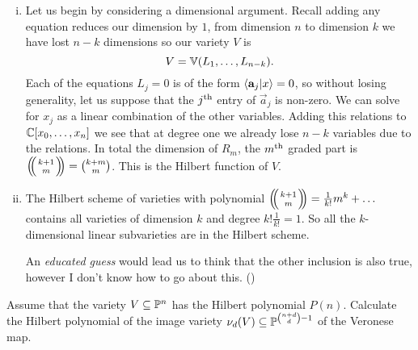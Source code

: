 \documentclass[12pt]{memoir}
\begin{document}
\begin{ptcbr}
	\begin{enumerate}[i)]
		\itemsep=-0.4em
		\item Let us begin by considering a dimensional argument. Recall adding any equation reduces our dimension by $1$, from dimension $n$ to dimension $k$ we have lost $n-k$ dimensions so our variety $V$ is 
		$$V=\mathbb{V}(L_1,\dots,L_{n-k}).$$
		Each of the equations $L_j=0$ is of the form $\braket{\mathbf{a}_j}{x}=0$, so without losing generality, let us suppose that the $j\textsuperscript{th}$ entry of $\vec{a}_j$ is non-zero. We can solve for $x_j$ as a linear combination of the other variables. Adding this relations to $\mathbb{C}[x_0,\dots,x_n]$ we see that at degree one we already lose $n-k$ variables due to the relations. In total the dimension of $R_m$, the $m\textsuperscript{th}$ graded part is $\multinom{k+1}{m}=\binom{k+m}{m}$. This is the Hilbert function of $V$.
		\item The Hilbert scheme of varieties with polynomial $\multinom{k+1}{m}=\frac{1}{k!}m^k+\dots$ contains all varieties of dimension $k$ and degree $k!\frac{1}{k!}=1$. So all the $k$-dimensional linear subvarieties are in the Hilbert scheme.\par 
		An \emph{educated guess} would lead us to think that the other inclusion is also true, however I don't know how to go about this. ()
	\end{enumerate}
\end{ptcbr}

\begin{Ej}
	Assume that the variety $V\subseteq\mathbb{P}^n$ has the Hilbert polynomial
	$P(n)$. Calculate the Hilbert polynomial of the image variety $\nu_d(V)\subseteq \mathbb{P}^{\binom{n+d}{d}-1}$ of the Veronese map. 
\end{Ej}
\end{document}
